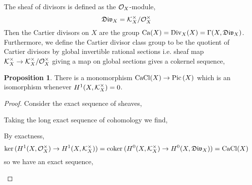\documentclass[12pt]{extarticle}
\newcommand{\coker}[1]{\mathrm{coker}\: #1}
\theoremstyle{definition}
\newtheorem{proposition}[theorem]{Proposition}
\newenvironment{definition}[1][Definition:]{\begin{trivlist}
\item[\hskip \labelsep {\bfseries #1}]}{\end{trivlist}}
\begin{document}
\begin{definition}
The sheaf of divisors is defined as the $\mathcal{O}_{X}$-module,
\[ \mathfrak{Div}_X =  \mathcal{K}_X^\times / \mathcal{O}_{X}^\times \]
Then the Cartier divisors on $X$ are the group $\mathrm{Ca}(X) = \mathrm{Div}_X(X) = \Gamma(X, \mathfrak{Div}_X)$. Furthermore, we define the Cartier divisor class group to be the quotient of Cartier divisors by global invertible rational sections i.e. sheaf map $\mathcal{K}_X^\times \to \mathcal{K}_X^\times / \mathcal{O}_{X}^\times$ giving a map on global sections gives a cokernel sequence,
\begin{center}
\end{center}
\end{definition}

\begin{proposition}
There is a monomorphism $\mathrm{CaCl}(X) \to \mathrm{Pic}\left( X \right)$ which is an isomorphism whenever $H^1(X, \mathcal{K}_X^\times) = 0$.
\end{proposition}

\begin{proof}
Consider the exact sequence of sheaves,
\begin{center}
\end{center}
Taking the long exact sequence of cohomology we find,
\begin{center}
\end{center}
By exactness, 
\[ \ker{(H^1(X, \struct{X}^\times) \to H^1(X, \K_X^\times))} = \coker{(H^0(X, \K_X^\times) \to H^0(X, \shDiv_X))} = \CaCl(X) \]  
so we have an exact sequence,
\begin{center}
\end{center} 
\end{proof}
\end{document}
